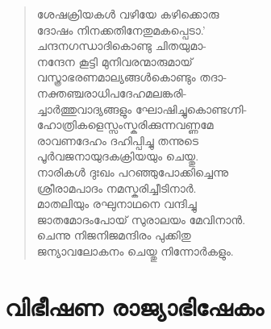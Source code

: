 \begin{verse}
ശേഷക്രിയകള്‍ വഴിയേ കഴിക്കൊരു\\
ദോഷം നിനക്കതിനേതുമകപ്പെടാ.’\\
ചന്ദനഗന്ധാദികൊണ്ടു ചിതയുമാ-\\
നന്ദേന കൂട്ടി മുനിവരന്മാരുമായ്\\
വസ്ത്രാഭരണമാല്യങ്ങള്‍കൊണ്ടും തദാ-\\
നക്തഞ്ചരാധിപദേഹമലങ്കരി-\\
ച്ചാര്‍ത്തുവാദ്യങ്ങളും ഘോഷിച്ചുകൊണ്ടഗ്നി-\\
ഹോത്രികളെസ്സംസ്കരിക്കുന്നവണ്ണമേ\\
രാവണദേഹം ദഹിപ്പിച്ചു തന്നുടെ\\
പൂര്‍വജനായുദകക്രിയയും ചെയ്തു.\\
നാരികള്‍ ദുഃഖം പറഞ്ഞുപോക്കിച്ചെന്നു\\
ശ്രീരാമപാദം നമസ്കരിച്ചീടിനാര്‍.\\
മാതലിയും രഘുനാഥനെ വന്ദിച്ചു\\
ജാതമോദംപോയ് സുരാലയം മേവിനാന്‍.\\
ചെന്നു നിജനിജമന്ദിരം പുക്കിതു\\
ജന്യാവലോകനം ചെയ്തു നിന്നോര്‍കളും.
\end{verse}


\section{വിഭീഷണ രാജ്യാഭിഷേകം}

